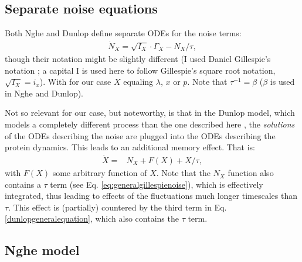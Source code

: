 \subsection*{Separate noise equations}

Both Nghe and Dunlop define separate ODEs for the noise terms:
%
\begin{align}
\label{eq:generalgillespienoise}
\dot{N}_X = \sqrt{I_X} \cdot \Gamma_X - N_X/\tau
,
\end{align}
%
though their notation might be slightly different (I used Daniel Gillespie's notation \cite{Gillespie1996}; a capital I is used here to follow Gillespie's square root notation, $\sqrt{I_X}=i_x$).
With for our case $X$ equaling $\lambda$, $x$ or $p$. Note that $\tau^{-1}=\beta$ ($\beta$ is used in Nghe and Dunlop).

Not so relevant for our case, but noteworthy, is that in the Dunlop model, which models a completely different process than the one described here \cite{Dunlop2008}, the \textit{solutions} of the ODEs describing the noise are plugged into the ODEs describing the protein dynamics. This leads to an additional memory effect.
%
That is:
%
\begin{align}
\label{dunlopgeneralequation}
\dot{X} = & N_X  + F(X) + X/\tau
,
\end{align}
%
with $F(X)$ some arbitrary function of $X$. 
Note that the $N_X$ function also contains a $\tau$ term (see Eq. \ref{eq:generalgillespienoise}), which is effectively integrated, thus leading to effects of the fluctuations much longer timescales than $\tau$. 
This effect is (partially) countered by the third term in Eq. \ref{dunlopgeneralequation}, which also contains the $\tau$ term.

\subsection*{Nghe model}

